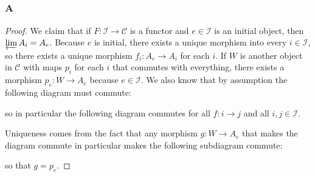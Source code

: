 \documentclass{article}
\newcommand{\id}{\mathrm{id}}
\newcommand{\fC}{\mathscr{C}}
\newcommand{\fI}{\mathscr{I}}
\begin{document}
\subsection{}
\subsubsection{A}\label{1.4.A}
\begin{proof}
    We claim that if $F:\mathscr{I}\to \fC$ is a functor and $e\in \fI$ is an initial object, then $\varprojlim A_i=A_e$. Because $e$ is initial, there exists a unique morphism into every $i\in \fI$, so there exists a unique morphism $f_i:A_e\to A_i$ for each $i$. If $W$ is another object in $\fC$ with maps $p_i$ for each $i$ that commutes with everything, there exists a morphism $p_e:W\to A_e$ because $e\in \fI$. We also know that by assumption the following diagram must commute:
    \begin{center}
    \end{center}
    so in particular the following diagram commutes for all $f:i\to j$ and all $i,j\in \fI$.
    \begin{center}
    \end{center}
    Uniqueness comes from the fact that any morphism $g:W\to A_e$ that makes the diagram commute in particular makes the following subdiagram commute:
    \begin{center}
    \end{center}
    so that $g=p_e$.
\end{proof}
\end{document}
